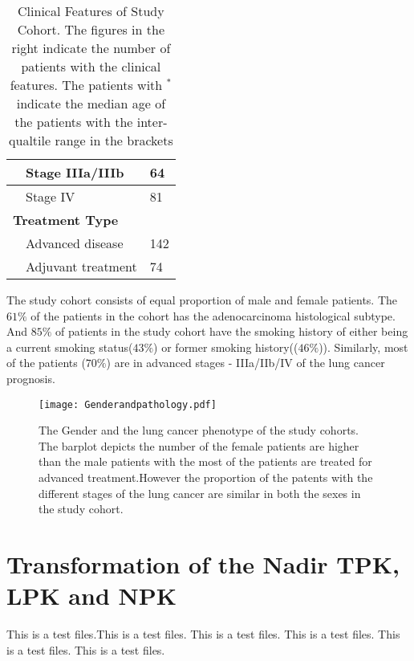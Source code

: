 \begin{table}[thb]
\begin{tabular}{lll}
		\multicolumn{1}{|l|}{} & \multicolumn{1}{l|}{Stage IIIa/IIIb} & \multicolumn{1}{l|}{64} \\ \hline
		\multicolumn{1}{|l|}{} & \multicolumn{1}{l|}{Stage IV} & \multicolumn{1}{l|}{81} \\ \hline
		\multicolumn{3}{|l|}{\textbf{Treatment Type}} \\ \hline
		\multicolumn{1}{|l|}{} & \multicolumn{1}{l|}{Advanced disease} & \multicolumn{1}{l|}{142} \\ \hline
		\multicolumn{1}{|l|}{} & \multicolumn{1}{l|}{Adjuvant treatment} & \multicolumn{1}{l|}{74} \\ \hline
	\end{tabular}
	\caption{Clinical Features of Study Cohort. The figures in the right indicate the number of patients with the clinical features. The patients with $^*$ indicate the median age of the patients with the inter-qualtile range in the brackets}
	\label{Clinical-features-tables}
\end{table}
\newpage
\clearpage

The study cohort consists of equal proportion of male and female patients. The $61\%$ of the patients in the cohort has the adenocarcinoma histological subtype. And $85\%$ of patients in the study cohort have the smoking history of either being a current smoking status($43\%$) or former smoking history(($46\%$)). Similarly, most of the patients ($70\%$) are in advanced stages -  IIIa/IIb/IV of the lung cancer prognosis.   

\begin{figure}[h]
	\begin{center}
		\texttt{[image: Genderandpathology.pdf]}
		\caption{The Gender and the lung cancer phenotype of the study cohorts. The barplot depicts the number of the female patients are higher than the male patients with the most of the patients are treated for advanced treatment.However the proportion of the patents with the different stages of the lung cancer are similar in both the sexes in the study cohort.}
		\label{Genderpathology}
	\end{center}
\end{figure}

\section{Transformation of the Nadir TPK, LPK and NPK }

This is a test files.This is a test files.
This is a test files.
This is a test files.
This is a test files.
This is a test files.

